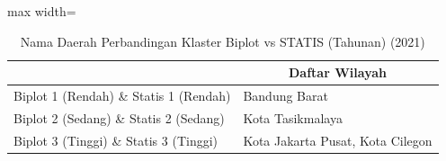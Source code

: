 \begin{table}[H]
\centering
\caption{Nama Daerah Perbandingan Klaster Biplot vs STATIS (Tahunan) (2021)} \label{tab:sample2biplot_statis_comp_name_2021}
\begin{adjustbox}{max width=\textwidth}
\begin{tabular}{|>{\centering\arraybackslash}p{4cm}|p{10cm}|}
\hline
\multicolumn{1}{|c|}{\textbf{Kategori}} & \multicolumn{1}{c|}{\textbf{Daftar Wilayah}} \\
\hline
Biplot 1 (Rendah) \& Statis 1 (Rendah) & Bandung Barat \\
\hline
Biplot 2 (Sedang) \& Statis 2 (Sedang) & Kota Tasikmalaya \\
\hline
Biplot 3 (Tinggi) \& Statis 3 (Tinggi) & Kota Jakarta Pusat, Kota Cilegon \\
\hline
\end{tabular}
\end{adjustbox}
\end{table}